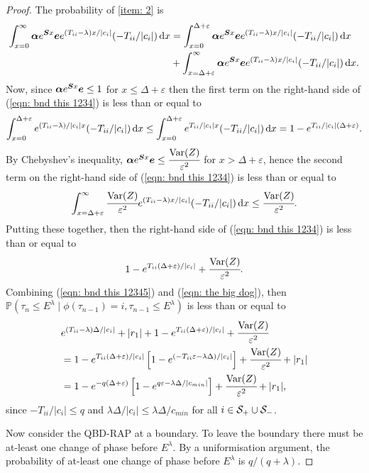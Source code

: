 \begin{proof}
	The probability of \ref{item: 2} is 
	\begin{align}
		\nonumber\int_{x=0}^\infty \boldsymbol \alpha e^{\boldsymbol{S}x}\boldsymbol e e^{(T_{ii}-\lambda)x/|c_i|}(-T_{ii}/|c_i|)\, \mathrm{d} x 
		&= \int_{x=0}^{\Delta+\varepsilon} \boldsymbol \alpha e^{\boldsymbol{S}x}\boldsymbol ee^{(T_{ii}-\lambda)x/|c_i|}(-T_{ii}/|c_i|)\, \mathrm{d} x 
		\\&{}+\int_{x=\Delta+\varepsilon}^\infty \boldsymbol \alpha e^{\boldsymbol{S}x}\boldsymbol e e^{(T_{ii}-\lambda)x/|c_i|}(-T_{ii}/|c_i|)\, \mathrm{d} x.\label{eqn: bnd this 1234}
	\end{align}
	Now, since \(\boldsymbol \alpha e^{\boldsymbol{S}x}\boldsymbol e\leq 1\) for \(x\leq \Delta+\varepsilon\) then the first term on the right-hand side of (\ref{eqn: bnd this 1234}) is less than or equal to 
	\[\displaystyle \int_{x=0}^{\Delta+\varepsilon} e^{(T_{ii}-\lambda)/|c_i|x}(-T_{ii}/|c_i|)\, \mathrm{d} x \leq \int_{x=0}^{\Delta+\varepsilon} e^{T_{ii}/|c_i|x}(-T_{ii}/|c_i|)\, \mathrm{d} x = 1-e^{T_{ii}/|c_i|(\Delta+\varepsilon)}.\]
	By Chebyshev's inequality, \(\boldsymbol \alpha e^{\boldsymbol{S}x}\boldsymbol e\leq \cfrac{\mathrm{Var}(Z)}{\varepsilon^2}\) for \(x> \Delta+\varepsilon\), hence the second term on the right-hand side of (\ref{eqn: bnd this 1234}) is less than or equal to 
	\[\displaystyle \int_{x=\Delta+\varepsilon}^\infty \cfrac{\mathrm{Var}(Z)}{\varepsilon^2} e^{(T_{ii}-\lambda)x/|c_i|}(-T_{ii}/|c_i|)\, \mathrm{d} x \leq  \cfrac{\mathrm{Var}(Z)}{\varepsilon^2}.\]
	Putting these together, then the right-hand side of (\ref{eqn: bnd this 1234}) is less than or equal to
	\begin{align}
		1-e^{T_{ii}(\Delta+\varepsilon)/|c_i|} + \cfrac{\mathrm{Var}(Z)}{\varepsilon^2}.\label{eqn: the big dog}
	\end{align}	
	Combining (\ref{eqn: bnd this 12345}) and (\ref{eqn: the big dog}), then \(\mathbb P(\tau_n\leq E^\lambda  \mid \phi(\tau_{n-1})=i , \tau_{n-1}\leq  E^\lambda)\) is less than or equal to 
	\begin{align}
		&e^{(T_{ii}-\lambda)\Delta/|c_i|} + |r_1| + 1-e^{T_{ii}(\Delta+\varepsilon)/|c_i|} + \cfrac{\mathrm{Var}(Z)}{\varepsilon^2}\nonumber
		\\&= 1-e^{T_{ii}(\Delta+\varepsilon)/|c_i|}\left[1-e^{(-T_{ii}\varepsilon-\lambda \Delta)/|c_i|}\right] + \cfrac{\mathrm{Var}(Z)}{\varepsilon^2} + |r_1| \nonumber 
		\\&= 1-e^{-q(\Delta+\varepsilon)}\left[1-e^{q\varepsilon-\lambda \Delta/|c_{min}|}\right] + \cfrac{\mathrm{Var}(Z)}{\varepsilon^2} + |r_1|,
	\end{align}
	since \(-T_{ii}/|c_i|\leq q\) and \(\lambda \Delta/|c_i| \leq \lambda \Delta/c_{min}\) for all \(i\in\mathcal S_+\cup \mathcal{S}_-\). 
	
	Now consider the QBD-RAP at a boundary. To leave the boundary there must be at-least one change of phase before \(E^\lambda\). By a uniformisation argument, the probability of at-least one change of phase before \(E^\lambda\) is \(q/(q+\lambda)\). 
\end{proof}

